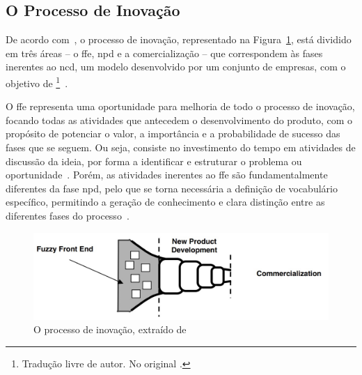 \subsection{O Processo de Inovação}
De acordo com~\textcite{ffe_effectivemethods_tools_techniques}, o processo de inovação, representado na Figura~\ref{fig:inovation_process}, está dividido em três áreas -- o \gls{ffe}, \gls{npd} e a comercialização -- que correspondem às fases inerentes ao \gls{ncd}, um modelo desenvolvido por um conjunto de empresas, com o objetivo de \footnote{Tradução livre de autor. No original .}~\parencite{providing_clarity_common_language_ffe}.

O \gls{ffe} representa uma oportunidade para melhoria de todo o processo de inovação, focando todas as atividades que antecedem o desenvolvimento do produto, com o propósito de potenciar o valor, a importância e a probabilidade de sucesso das fases que se seguem. Ou seja, consiste no investimento do tempo em atividades de discussão da ideia, por forma a identificar e estruturar o problema ou oportunidade~\parencite{ffe_effectivemethods_tools_techniques, ffe_theoretical_model}. Porém, as atividades inerentes ao \gls{ffe} são fundamentalmente diferentes da fase \gls{npd}, pelo que se torna necessária a definição de vocabulário específico, permitindo a geração de conhecimento e clara distinção entre as diferentes fases do processo~\parencite{ffe_effectivemethods_tools_techniques}.

\begin{figure}[!ht]
    \centering
    \includegraphics[width=.95\textwidth]{ch02/assets/inovation_process.jpg}
    \caption{O processo de inovação, extraído de~\textcite{ffe_effectivemethods_tools_techniques}}
    \label{fig:inovation_process}
\end{figure}

